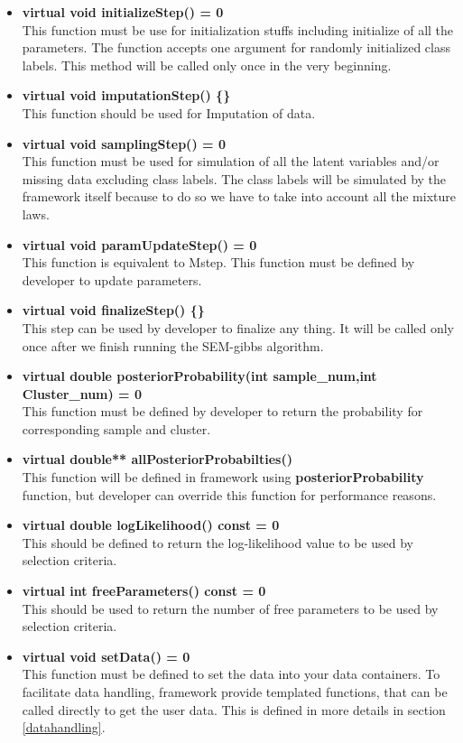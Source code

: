 \documentclass[a4paper,11pt]{article}
\begin{document}
\begin{itemize}
\item {\bf virtual void initializeStep() = 0} \\
This function must be use for initialization stuffs including initialize of all
the parameters. The function accepts one argument for randomly initialized class
labels. This method will be called only once in the very beginning.
\item {\bf virtual void imputationStep() \{\}}\\
This function should be used for Imputation of data.
\item {\bf virtual void samplingStep() = 0} \\
This function must be used for simulation of all the latent variables and/or missing data
excluding class labels. The class labels will be simulated by the framework itself because to do so
we have to take into account all the mixture laws. 
\item {\bf virtual void paramUpdateStep() = 0}\\
This function is equivalent to Mstep. This function must be defined by developer to update parameters.
\item {\bf virtual void finalizeStep() \{\}}\\
This step can be used by developer to finalize any thing. It will be called only once after we
finish running the SEM-gibbs algorithm.
\item {\bf virtual double posteriorProbability(int sample\_num,int Cluster\_num) = 0}\\
This function must be defined by developer to return the probability for corresponding sample and cluster.
\item {\bf virtual double** allPosteriorProbabilties()}\\
This function will be defined in framework using {\bf posteriorProbability} function, but developer
can override this function for performance reasons.
\item {\bf virtual double logLikelihood() const = 0}\\
This should be defined to return the log-likelihood value to be used by selection criteria.
\item {\bf virtual int freeParameters() const = 0}\\
This should be used to return the number of free parameters to be used by selection criteria.
\item {\bf virtual void setData() = 0}\\
This function must be defined to set the data into your data containers. To facilitate data handling, framework provide templated functions,
that can be called directly to get the user data. This is defined in more details in section \ref{datahandling}.
\end{itemize}
\end{document}

